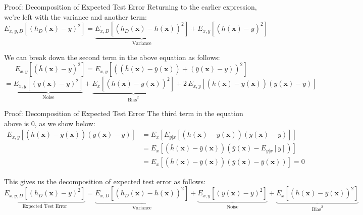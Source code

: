 \documentclass[serif, aspectratio=169]{beamer}
\begin{document}
    \begin{frame}{Proof: Decomposition of Expected Test Error}
        Returning to the earlier expression, we're left with the variance and another term:
        \[
            E_{x,y,D}\left[(h_D(\mathbf{x}) - y)^2\right] = \underbrace{E_{x,D}\left[(h_D(\mathbf{x}) - \bar{h}(\mathbf{x}))^2\right]}_{\text{Variance}} + E_{x,y}\left[(\bar{h}(\mathbf{x}) - y)^2\right]
        \]

        We can break down the second term in the above equation as follows:
        \[
            E_{x,y}\left[(\bar{h}(\mathbf{x}) - y)^2\right] = E_{x,y}\left[((\bar{h}(\mathbf{x}) - \bar{y}(\mathbf{x})) + (\bar{y}(\mathbf{x}) - y))^2\right]
        \]
        \[
            = \underbrace{E_{x,y}\left[(\bar{y}(\mathbf{x}) - y)^2\right]}_{\text{Noise}} + \underbrace{E_x\left[(\bar{h}(\mathbf{x}) - \bar{y}(\mathbf{x}))^2\right]}_{\text{Bias}^2} + 2\,E_{x,y}\left[(\bar{h}(\mathbf{x}) - \bar{y}(\mathbf{x}))(\bar{y}(\mathbf{x}) - y)\right]
        \]
    \end{frame}

    \begin{frame}{Proof: Decomposition of Expected Test Error}
        The third term in the equation above is 0, as we show below:
        \begin{align*}
            E_{x,y}\left[(\bar{h}(\mathbf{x}) - \bar{y}(\mathbf{x}))(\bar{y}(\mathbf{x}) - y)\right]
            &= E_x\left[E_{y|x}\left[(\bar{h}(\mathbf{x}) - \bar{y}(\mathbf{x}))(\bar{y}(\mathbf{x}) - y)\right]\right] \\
            &= E_x\left[(\bar{h}(\mathbf{x}) - \bar{y}(\mathbf{x}))(\bar{y}(\mathbf{x}) - E_{y|x}[y])\right] \\
            &= E_x\left[(\bar{h}(\mathbf{x}) - \bar{y}(\mathbf{x}))(\bar{y}(\mathbf{x}) - \bar{y}(\mathbf{x}))\right] = 0
        \end{align*}

        This gives us the decomposition of expected test error as follows:
        \[
            \underbrace{E_{x,y,D}\left[(h_D(\mathbf{x}) - y)^2\right]}_{\text{Expected Test Error}}
            = \underbrace{E_{x,D}\left[(h_D(\mathbf{x}) - \bar{h}(\mathbf{x}))^2\right]}_{\text{Variance}}
            + \underbrace{E_{x,y}\left[(\bar{y}(\mathbf{x}) - y)^2\right]}_{\text{Noise}}
            + \underbrace{E_x\left[(\bar{h}(\mathbf{x}) - \bar{y}(\mathbf{x}))^2\right]}_{\text{Bias}^2}
        \]
    \end{frame}
\end{document}
